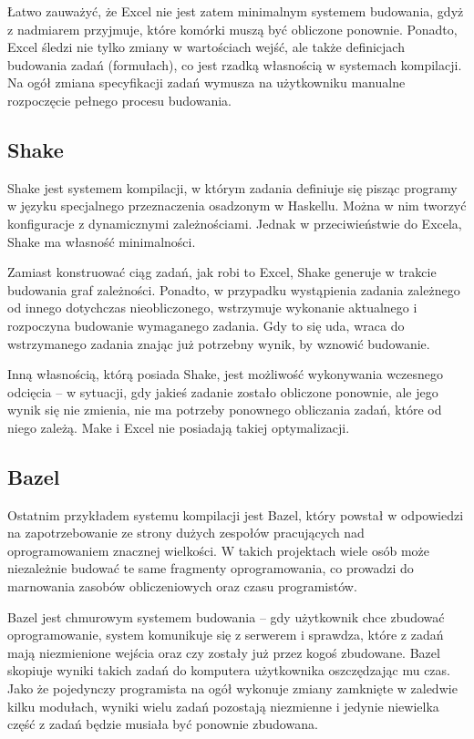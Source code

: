 \pagebreak

Łatwo zauważyć, że Excel nie jest zatem minimalnym systemem budowania, gdyż z nadmiarem przyjmuje, które komórki muszą być obliczone ponownie. Ponadto, Excel śledzi nie tylko zmiany w wartościach wejść, ale także definicjach budowania zadań (formułach), co jest rzadką własnością w systemach kompilacji. Na ogół zmiana specyfikacji zadań wymusza na użytkowniku manualne rozpoczęcie pełnego procesu budowania.

\subsection{Shake}

Shake jest systemem kompilacji, w którym zadania definiuje się pisząc programy w języku specjalnego przeznaczenia osadzonym w Haskellu. Można w nim tworzyć konfiguracje z dynamicznymi zależnościami. Jednak w przeciwieństwie do Excela, Shake ma własność minimalności.

Zamiast konstruować ciąg zadań, jak robi to Excel, Shake generuje w trakcie budowania graf zależności. Ponadto, w przypadku wystąpienia zadania zależnego od innego dotychczas nieobliczonego, wstrzymuje wykonanie aktualnego i rozpoczyna budowanie wymaganego zadania. Gdy to się uda, wraca do wstrzymanego zadania znając już potrzebny wynik, by wznowić budowanie.

Inną własnością, którą posiada Shake, jest możliwość wykonywania wczesnego odcięcia -- w sytuacji, gdy jakieś zadanie zostało obliczone ponownie, ale jego wynik się nie zmienia, nie ma potrzeby ponownego obliczania zadań, które od niego zależą. Make i Excel nie posiadają takiej optymalizacji.

\subsection{Bazel}

Ostatnim przykładem systemu kompilacji jest Bazel, który powstał w odpowiedzi na zapotrzebowanie ze strony dużych zespołów pracujących nad oprogramowaniem znacznej wielkości. W takich projektach wiele osób może niezależnie budować te same fragmenty oprogramowania, co prowadzi do marnowania zasobów obliczeniowych oraz czasu programistów.

Bazel jest chmurowym systemem budowania -- gdy użytkownik chce zbudować oprogramowanie, system komunikuje się z serwerem i sprawdza, które z zadań mają niezmienione wejścia oraz czy zostały już przez kogoś zbudowane. Bazel skopiuje wyniki takich zadań do komputera użytkownika oszczędzając mu czas. Jako że pojedynczy programista na ogół wykonuje zmiany zamknięte w zaledwie kilku modułach, wyniki wielu zadań pozostają niezmienne i jedynie niewielka część z zadań będzie musiała być ponownie zbudowana.

